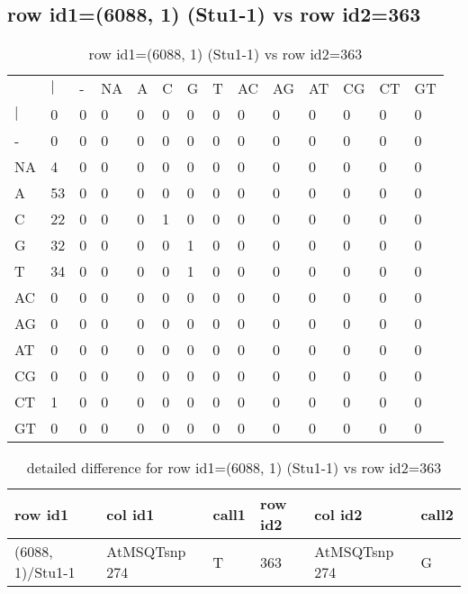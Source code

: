 \subsection{row id1=(6088, 1) (Stu1-1) vs row id2=363}
\begin{center}
\begin{longtable}{|l|l|l|l|l|l|l|l|l|l|l|l|l|l|}
\caption{row id1=(6088, 1) (Stu1-1) vs row id2=363} \label{table_dm50}\\
\hline
\\
\hline
&$|$&-&NA&A&C&G&T&AC&AG&AT&CG&CT&GT\\
$|$&0&0&0&0&0&0&0&0&0&0&0&0&0\\
-&0&0&0&0&0&0&0&0&0&0&0&0&0\\
NA&4&0&0&0&0&0&0&0&0&0&0&0&0\\
A&53&0&0&0&0&0&0&0&0&0&0&0&0\\
C&22&0&0&0&1&0&0&0&0&0&0&0&0\\
G&32&0&0&0&0&1&0&0&0&0&0&0&0\\
T&34&0&0&0&0&1&0&0&0&0&0&0&0\\
AC&0&0&0&0&0&0&0&0&0&0&0&0&0\\
AG&0&0&0&0&0&0&0&0&0&0&0&0&0\\
AT&0&0&0&0&0&0&0&0&0&0&0&0&0\\
CG&0&0&0&0&0&0&0&0&0&0&0&0&0\\
CT&1&0&0&0&0&0&0&0&0&0&0&0&0\\
GT&0&0&0&0&0&0&0&0&0&0&0&0&0\\
\hline
\end{longtable}
\end{center}

\begin{center}
\begin{longtable}{|l|l|l|l|l|l|}
\caption{detailed difference for row id1=(6088, 1) (Stu1-1) vs row id2=363} \label{table_dm51}\\
\hline
row id1&col id1&call1&row id2&col id2&call2\\
\hline
(6088, 1)/Stu1-1&AtMSQTsnp 274&T&363&AtMSQTsnp 274&G\\
\hline
\end{longtable}
\end{center}

